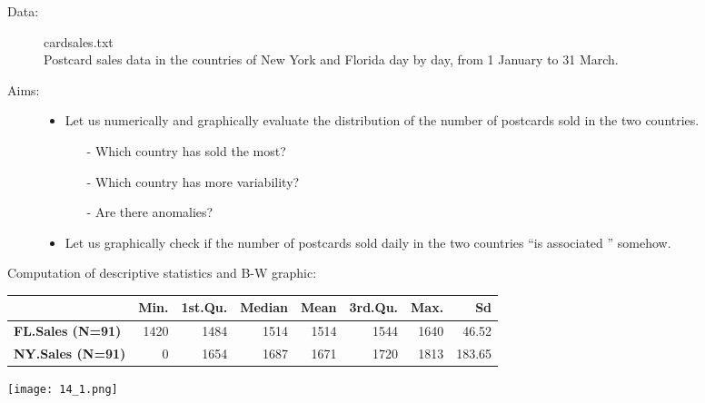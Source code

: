 

\begin{frame} 
\begin{description}
\item[Data:] cardsales.txt\\
Postcard sales data in the countries of New York and Florida day by day, from 1 January to 31 March.
\item[Aims:] \begin{itemize}
\item 
Let us numerically and graphically evaluate the distribution of the number of postcards sold in the two countries.
\begin{itemize}
\item[-] Which country has sold the most?
\item[-] Which country has more variability? 
\item[-] Are there anomalies?
\end{itemize}
\item Let us graphically check if the number of postcards sold daily in the two countries ``is associated '' somehow.
\end{itemize}

\end{description}
 
\end{frame}

\begin{frame}
Computation of descriptive statistics and B-W graphic:\\
	\vspace{.3cm}
	\begin{footnotesize}
	\begin{tabular}{|l|rrrrrrr|}
	\hline
	& \textbf{Min}. & 1\textbf{st.Qu}. & \textbf{Median} & \textbf{Mean} & \textbf{3rd.Qu.} & \textbf{Max.} & \textbf{Sd}\\
	\hline
	\textbf{FL.Sales (N=91)} & 1420 & 1484 & 1514 & 1514 & 1544 & 1640 & 46.52 \\
	\textbf{NY.Sales (N=91)} & 0 & 1654 & 1687 & 1671 & 1720 & 1813 & 183.65 \\
	\hline	
	\end{tabular}
	\end{footnotesize}
	\begin{center}
		\texttt{[image: 14\_1.png]}
	\end{center}
\end{frame}


